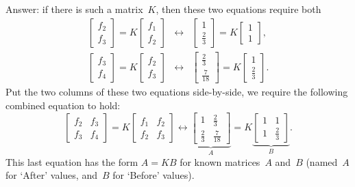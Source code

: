\begin{reduce}
\begin{example}
\begin{solution}
\begin{enumerate}[ref=\ref{eg:2expfit}(\alph*)]
Answer: if there is such a matrix~\(K\), then these two equations require both
\begin{eqnarray*}
\begin{bmatrix} f_2\\f_3 \end{bmatrix}
=K\begin{bmatrix} f_1\\f_2 \end{bmatrix}
&\leftrightarrow& \begin{bmatrix} 1\\\frac23 \end{bmatrix}
=K\begin{bmatrix} 1\\1 \end{bmatrix},
\\
\begin{bmatrix} f_3\\f_4 \end{bmatrix}
=K\begin{bmatrix} f_2\\f_3 \end{bmatrix}
&\leftrightarrow& \begin{bmatrix} \frac23\\\frac7{18} \end{bmatrix}
=K\begin{bmatrix} 1\\\frac23 \end{bmatrix}.
\end{eqnarray*}
Put the two columns of these two equations side-by-side, we require the following combined equation to hold:
\begin{equation*}
\begin{bmatrix} f_2&f_3\\f_3&f_4 \end{bmatrix}
=K\begin{bmatrix} f_1&f_2\\f_2&f_3 \end{bmatrix}
\leftrightarrow 
\underbrace{\begin{bmatrix} 1&\frac23\\\frac23&\frac7{18} \end{bmatrix}}_A
=K\underbrace{\begin{bmatrix} 1&1\\1&\frac23 \end{bmatrix}}_B.
\end{equation*}
This last equation has the form \(A=KB\) for known matrices~\(A\) and~\(B\) (named~\(A\) for `After' values, and~\(B\) for `Before' values).


\end{enumerate}
\end{solution}
\end{example}
\end{reduce}
